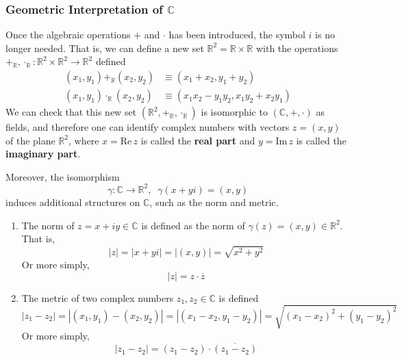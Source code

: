     \subsubsection[Geometric Interpretation of C]{Geometric Interpretation of $\mathbb{C}$}
    Once the algebraic operations $+$ and $\cdot$ has been introduced, the symbol $i$ is no longer needed. That is, we can define a new set $\mathbb{R}^2 = \mathbb{R} \times \mathbb{R}$ with the operations $+_\mathbb{R}, \cdot_\mathbb{R} : \mathbb{R}^2 \times \mathbb{R}^2 \longrightarrow \mathbb{R}^2$ defined
    \begin{align*}
        (x_1, y_1) +_\mathbb{R} (x_2, y_2) & \equiv (x_1 + x_2, y_1 + y_2) \\
        (x_1, y_1) \cdot_\mathbb{R} (x_2, y_2) & \equiv (x_1 x_2 - y_1 y_2, x_1 y_2 + x_2 y_1)
    \end{align*}
    We can check that this new set $(\mathbb{R}^2, +_\mathbb{R}, \cdot_{\mathbb{R}})$ is isomorphic to $(\mathbb{C}, +, \cdot)$ as fields, and therefore one can identify complex numbers with vectors $z = (x, y)$ of the plane $\mathbb{R}^2$, where $x = \text{Re}\,z$ is called the \textbf{real part} and $y = \text{Im}\,z$ is called the \textbf{imaginary part}. 

    \begin{definition}
      Moreover, the isomorphism
      \[\gamma: \mathbb{C} \longrightarrow \mathbb{R}^2, \;\; \gamma(x + yi) = (x, y)\]
      induces additional structures on $\mathbb{C}$, such as the norm and metric. 
      \begin{enumerate}
        \item The norm of $z = x + iy \in \mathbb{C}$ is defined as the norm of $\gamma(z) = (x, y) \in \mathbb{R}^2$. That is, 
        \[|z| = |x + yi| = |(x, y)| = \sqrt{x^2 + y^2}\]
        Or more simply, 
        \[|z| = z \cdot \overline{z}\]
        \item The metric of two complex numbers $z_1, z_2 \in \mathbb{C}$ is defined
        \[|z_1 - z_2| = |(x_1, y_1) - (x_2, y_2)| = |(x_1 - x_2, y_1 - y_2)| = \sqrt{(x_1 - x_2)^2 + (y_1 - y_2)^2}\]
        Or more simply, 
        \[|z_1 - z_2| = (z_1 - z_2) \cdot \overline{(z_1 - z_2)}\]
      \end{enumerate}
    \end{definition}


